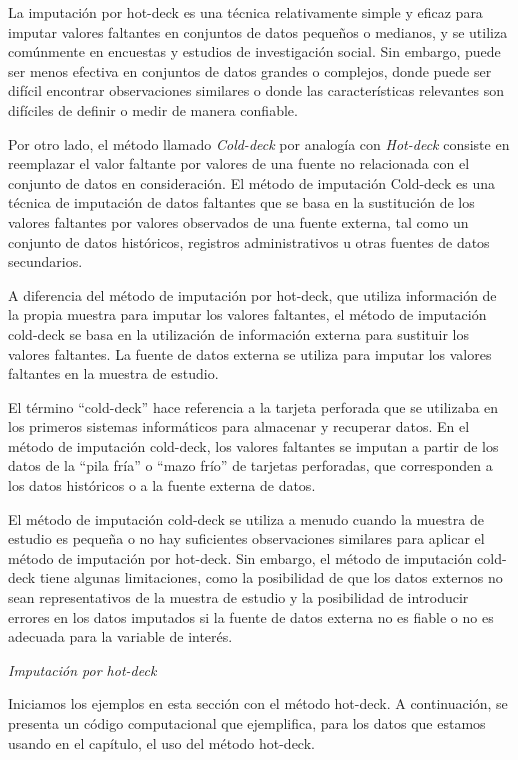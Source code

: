 \documentclass[
  spanish,
  12pt,
]{book}
\begin{document}
La imputación por hot-deck es una técnica relativamente simple y eficaz para imputar valores faltantes en conjuntos de datos pequeños o medianos, y se utiliza comúnmente en encuestas y estudios de investigación social. Sin embargo, puede ser menos efectiva en conjuntos de datos grandes o complejos, donde puede ser difícil encontrar observaciones similares o donde las características relevantes son difíciles de definir o medir de manera confiable.

Por otro lado, el método llamado \emph{Cold-deck} por analogía con \emph{Hot-deck} consiste en reemplazar el valor faltante por valores de una fuente no relacionada con el conjunto de datos en consideración. El método de imputación Cold-deck es una técnica de imputación de datos faltantes que se basa en la sustitución de los valores faltantes por valores observados de una fuente externa, tal como un conjunto de datos históricos, registros administrativos u otras fuentes de datos secundarios.

A diferencia del método de imputación por hot-deck, que utiliza información de la propia muestra para imputar los valores faltantes, el método de imputación cold-deck se basa en la utilización de información externa para sustituir los valores faltantes. La fuente de datos externa se utiliza para imputar los valores faltantes en la muestra de estudio.

El término ``cold-deck'' hace referencia a la tarjeta perforada que se utilizaba en los primeros sistemas informáticos para almacenar y recuperar datos. En el método de imputación cold-deck, los valores faltantes se imputan a partir de los datos de la ``pila fría'' o ``mazo frío'' de tarjetas perforadas, que corresponden a los datos históricos o a la fuente externa de datos.

El método de imputación cold-deck se utiliza a menudo cuando la muestra de estudio es pequeña o no hay suficientes observaciones similares para aplicar el método de imputación por hot-deck. Sin embargo, el método de imputación cold-deck tiene algunas limitaciones, como la posibilidad de que los datos externos no sean representativos de la muestra de estudio y la posibilidad de introducir errores en los datos imputados si la fuente de datos externa no es fiable o no es adecuada para la variable de interés.

\emph{Imputación por hot-deck}

Iniciamos los ejemplos en esta sección con el método hot-deck. A continuación, se presenta un código computacional que ejemplifica, para los datos que estamos usando en el capítulo, el uso del método hot-deck.
\end{document}
